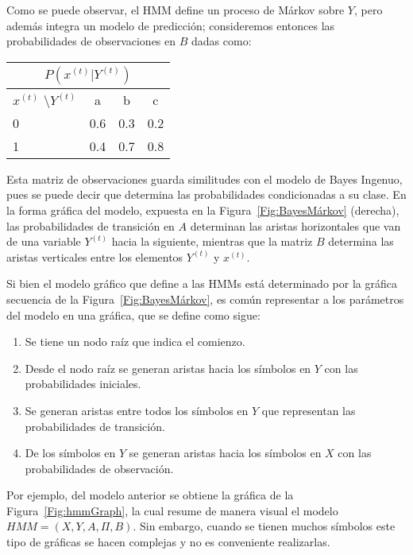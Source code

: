 Como se puede observar, el HMM define un proceso de Márkov sobre $Y$, pero además integra un modelo de predicción; consideremos entonces las probabilidades de observaciones en $B$ dadas como:

\begin{center}
 \begin{tabular}{l|ccc}
  \multicolumn{4}{c}{$P(x^{(t)}|Y^{(t)})$} \\ \hline
  $x^{(t)}$ \textbackslash $Y^{(t)}$   & a & b & c \\ \hline
  0 &    0.6   &    0.3  & 0.2 \\
  1   &    0.4   &    0.7  & 0.8 
 \end{tabular}
 \end{center}

 Esta matriz de observaciones guarda similitudes con el modelo de Bayes Ingenuo, pues se puede decir que determina las probabilidades condicionadas a su clase. En la forma gráfica del modelo, expuesta en la Figura~\ref{Fig:BayesMárkov} (derecha), las probabilidades de transición en $A$ determinan las aristas horizontales que van de una variable $Y^{(t)}$ hacia la siguiente, mientras que la matriz $B$ determina las aristas verticales entre los elementos $Y^{(t)}$ y $x^{(t)}$.

 Si bien el modelo gráfico que define a las HMMs está determinado por la gráfica secuencia de la Figura~\ref{Fig:BayesMárkov}, es común representar a los parámetros del modelo en una gráfica, que se define como sigue:

 \begin{enumerate}
     \item Se tiene un nodo raíz que indica el comienzo.
     \item Desde el nodo raíz se generan aristas hacia los símbolos en $Y$ con las probabilidades iniciales.
     \item Se generan aristas entre todos los símbolos en $Y$ que representan las probabilidades de transición.
     \item De los símbolos en $Y$ se generan aristas hacia los símbolos en $X$ con las probabilidades de observación.
 \end{enumerate}

 Por ejemplo, del modelo anterior se obtiene la gráfica de la Figura~\ref{Fig:hmmGraph}, la cual resume de manera visual el modelo $HMM = (X,Y, A,\Pi, B)$. Sin embargo, cuando se tienen muchos símbolos este tipo de gráficas se hacen complejas y no es conveniente realizarlas.


